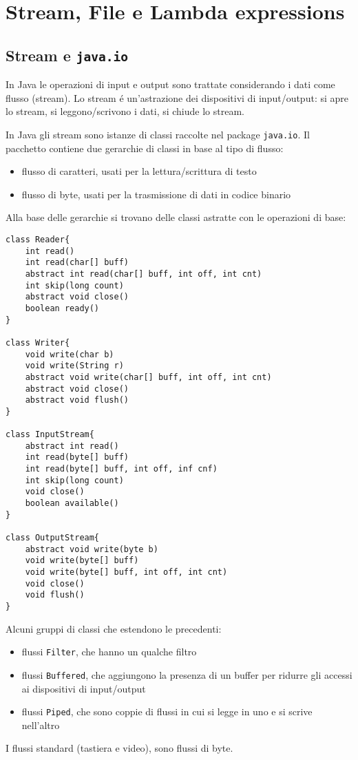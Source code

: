 \chapter{Stream, File e Lambda expressions}

\section{Stream e \texttt{java.io}}
In Java le operazioni di input e output sono trattate considerando i dati come flusso (stream). Lo stream é un'astrazione dei dispositivi di input/output: si apre lo stream, si leggono/scrivono i dati, si chiude lo stream.

In Java gli stream sono istanze di classi raccolte nel package \texttt{java.io}. Il pacchetto contiene due gerarchie di classi in base al tipo di flusso:
\begin{itemize}
 \item flusso di caratteri, usati per la lettura/scrittura di testo
 \item flusso di byte, usati per la trasmissione di dati in codice binario
\end{itemize}
Alla base delle gerarchie si trovano delle classi astratte con le operazioni di base:

\begin{lstlisting}
class Reader{
	int read()
	int read(char[] buff)
	abstract int read(char[] buff, int off, int cnt)
	int skip(long count)
	abstract void close()
	boolean ready()
}

class Writer{
	void write(char b)
	void write(String r)
	abstract void write(char[] buff, int off, int cnt)
	abstract void close()
	abstract void flush()
}

class InputStream{
	abstract int read()
	int read(byte[] buff)
	int read(byte[] buff, int off, inf cnf)
	int skip(long count)
	void close()
	boolean available()
}

class OutputStream{
	abstract void write(byte b)
	void write(byte[] buff)
	void write(byte[] buff, int off, int cnt)
	void close()
	void flush()
}
\end{lstlisting}

Alcuni gruppi di classi che estendono le precedenti:
\begin{itemize}
\item flussi \texttt{Filter}, che hanno un qualche filtro
\item flussi \texttt{Buffered}, che aggiungono la presenza di un buffer per ridurre gli accessi ai dispositivi di input/output
\item flussi \texttt{Piped}, che sono coppie di flussi in cui si legge in uno e si scrive nell'altro
\end{itemize}
I flussi standard (tastiera e video), sono flussi di byte.

